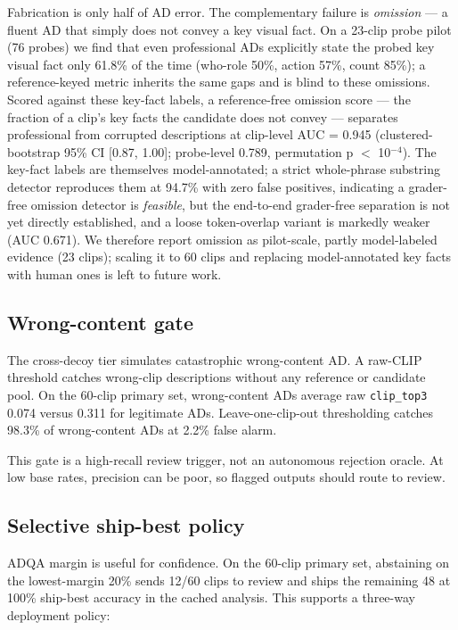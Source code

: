 \documentclass[10pt,twocolumn]{article}
\begin{document}
Fabrication is only half of AD error. The complementary failure is \emph{omission} --- a fluent AD that simply does not convey a key visual fact. On a 23-clip probe pilot (76 probes) we find that even professional ADs explicitly state the probed key visual fact only 61.8\% of the time (who-role 50\%, action 57\%, count 85\%); a reference-keyed metric inherits the same gaps and is blind to these omissions. Scored against these key-fact labels, a reference-free omission score --- the fraction of a clip's key facts the candidate does not convey --- separates professional from corrupted descriptions at clip-level AUC = 0.945 (clustered-bootstrap 95\% CI [0.87, 1.00]; probe-level 0.789, permutation p $<$ 10$^{-4}$). The key-fact labels are themselves model-annotated; a strict whole-phrase substring detector reproduces them at 94.7\% with zero false positives, indicating a grader-free omission detector is \emph{feasible}, but the end-to-end grader-free separation is not yet directly established, and a loose token-overlap variant is markedly weaker (AUC 0.671). We therefore report omission as pilot-scale, partly model-labeled evidence (23 clips); scaling it to 60 clips and replacing model-annotated key facts with human ones is left to future work.

\subsection{Wrong-content gate}

The cross-decoy tier simulates catastrophic wrong-content AD. A raw-CLIP threshold catches wrong-clip descriptions without any reference or candidate pool. On the 60-clip primary set, wrong-content ADs average raw \texttt{clip\_top3} 0.074 versus 0.311 for legitimate ADs. Leave-one-clip-out thresholding catches 98.3\% of wrong-content ADs at 2.2\% false alarm.


This gate is a high-recall review trigger, not an autonomous rejection oracle. At low base rates, precision can be poor, so flagged outputs should route to review.


\subsection{Selective ship-best policy}

ADQA margin is useful for confidence. On the 60-clip primary set, abstaining on the lowest-margin 20\% sends 12/60 clips to review and ships the remaining 48 at 100\% ship-best accuracy in the cached analysis. This supports a three-way deployment policy:
\end{document}
